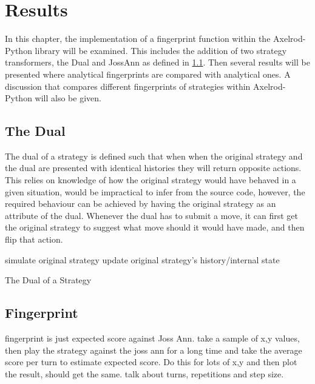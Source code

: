 
\chapter{Results}\label{cha:results}

In this chapter, the implementation of a fingerprint function within the Axelrod-Python library will be examined.
This includes the addition of two strategy transformers, the Dual and JossAnn as defined in \ref{}. %
Then several results will be presented where analytical fingerprints are compared with analytical ones.
A discussion that compares different fingerprints of strategies within Axelrod-Python will also be given.

\section{The Dual}
The dual of a strategy is defined such that when when the original strategy and the dual are presented with identical histories they will return opposite actions.
This relies on knowledge of how the original strategy would have behaved in a given situation, would be impractical to infer from the source code, however, the required behaviour can be achieved by having the original strategy as an attribute of the dual.
Whenever the dual has to submit a move, it can first get the original strategy to suggest what move should it would have made, and then flip that action.

\IncMargin{1.2em}
\begin{algorithm}[H]
  simulate original strategy\;
  update original strategy's history/internal state\;
 \caption{The Dual of a Strategy}
\end{algorithm}\DecMargin{1.5em}

\section{Fingerprint}\label{sec:fingerprint-implementation}

fingerprint is just expected score against Joss Ann.
take a sample of x,y values, then play the strategy against the joss ann for a long time and take the average score per turn to estimate expected score.
Do this for lots of x,y and then plot the result, should get the same.
talk about turns, repetitions and step size.

